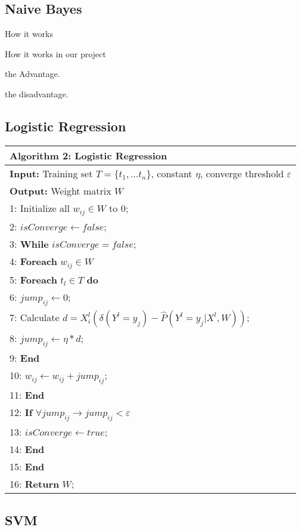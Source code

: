 
\subsection{Naive Bayes}
How it works

How it works in our project

the Advantage.

the disadvantage.
\subsection{Logistic Regression}

\renewcommand{\arraystretch}{1}
\vspace{-0.02in}
\begin{table}[htb]
\centering
\small
\begin{tabular}{l} \hline
\textbf{Algorithm 2:} Logistic Regression\\ \hline
\textbf{Input:} Training set $T=\{t_1,...t_n\}$, constant $\eta$, converge threshold $\varepsilon$\\
\textbf{Output:} Weight matrix $W$\\

\hspace{.15cm}1: Initialize all $w_{ij} \in W$ to 0;\\
\hspace{.15cm}2: $isConverge \leftarrow false$;\\
\hspace{.15cm}3: \textbf{While} $isConverge = false$;\\
\hspace{.15cm}4: \quad \textbf{Foreach} $w_{ij} \in W$\\
\hspace{.15cm}5: \quad \quad \textbf{Foreach} $t_l \in T$ \textbf{do} \\
\hspace{.15cm}6: \quad \quad \quad $jump_{ij} \leftarrow 0$;\\
\hspace{.15cm}7: \quad \quad \quad Calculate $d=X_{i}^{l}(\delta (Y^{l}=y_{j})-\hat{P}(Y^{l}=y_{j}|X^{l},W))$;\\
\hspace{.15cm}8: \quad \quad \quad $jump_{ij} \leftarrow \eta * d$; \\
\hspace{.15cm}9: \quad \quad \textbf{End}\\
10: \quad \quad $w_{ij} \leftarrow w_{ij} + jump_{ij}$;\\
11: \quad \textbf{End}\\
12: \quad \textbf{If} $\forall jump_{ij} \rightarrow jump_{ij} < \varepsilon$\\
13: \quad \quad $isConverge \leftarrow true$;\\
14: \quad \textbf{End}\\
15: \textbf{End}\\
16: \textbf{Return} $W$;\\
\hline
\end{tabular}
\normalsize
\end{table}

\subsection{SVM}
